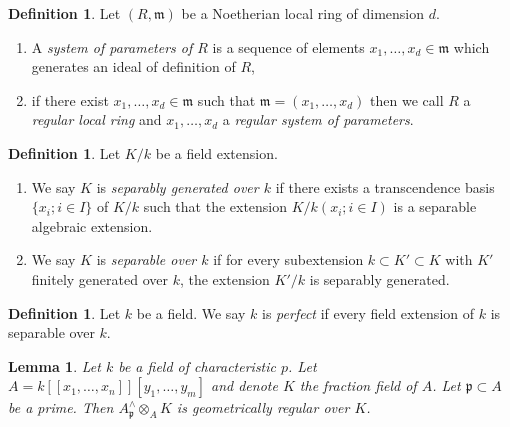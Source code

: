 \documentclass{amsart}
\theoremstyle{plain}
\newtheorem{lemma}[subsection]{Lemma}
\theoremstyle{definition}
\newtheorem{definition}[subsection]{Definition}
\theoremstyle{remark}
\numberwithin{equation}{subsection}
\begin{document}
\begin{definition}
\label{algebra-definition-regular-local}
Let $(R, \mathfrak m)$ be a Noetherian local ring of dimension $d$.
\begin{enumerate}
\item A {\it system of parameters of $R$} is a sequence of elements
$x_1, \ldots, x_d \in \mathfrak m$ which generates an ideal of
definition of $R$,
\item if there exist $x_1, \ldots, x_d \in \mathfrak m$
such that $\mathfrak m = (x_1, \ldots, x_d)$ then we call
$R$ a {\it regular local ring} and $x_1, \ldots, x_d$ a {\it regular
system of parameters}.
\end{enumerate}
\end{definition}

\begin{definition}
\label{algebra-definition-separable-field-extension}
Let $K/k$ be a field extension.
\begin{enumerate}
\item We say $K$ is {\it separably generated over $k$} if there exists
a transcendence basis $\{x_i; i \in I\}$ of $K/k$ such that the extension
$K/k(x_i; i \in I)$ is a separable algebraic extension.
\item We say $K$ is {\it separable over $k$} if for every subextension
$k \subset K' \subset K$ with $K'$ finitely generated
over $k$, the extension $K'/k$ is separably generated.
\end{enumerate}
\end{definition}

\begin{definition}
\label{algebra-definition-perfect}
Let $k$ be a field. We say $k$ is {\it perfect}
if every field extension of $k$ is separable over $k$.
\end{definition}

\begin{lemma}
\label{lemma-helper-G-ring}
Let $k$ be a field of characteristic $p$.
Let $A = k[[x_1, \ldots, x_n]][y_1, \ldots, y_m]$ and denote $K$
the fraction field of $A$.
Let $\mathfrak p \subset A$ be a prime. Then
$A_\mathfrak p^\wedge \otimes_A K$ is geometrically regular over $K$.
\end{lemma}
\end{document}
